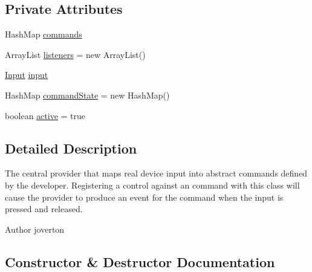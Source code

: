\subsection*{Private Attributes}
\begin{DoxyCompactItemize}
\item 
Hash\+Map \mbox{\hyperlink{classorg_1_1newdawn_1_1slick_1_1command_1_1_input_provider_ab2bd0c08506a59bc7457d7a87cf873d2}{commands}}
\item 
Array\+List \mbox{\hyperlink{classorg_1_1newdawn_1_1slick_1_1command_1_1_input_provider_a007146935ecc6c0f69ff3d7958042867}{listeners}} = new Array\+List()
\item 
\mbox{\hyperlink{classorg_1_1newdawn_1_1slick_1_1_input}{Input}} \mbox{\hyperlink{classorg_1_1newdawn_1_1slick_1_1command_1_1_input_provider_a7a9d7954c539d61bd8623da41c199d74}{input}}
\item 
Hash\+Map \mbox{\hyperlink{classorg_1_1newdawn_1_1slick_1_1command_1_1_input_provider_a343fea436b5ad6194968443cc58a632d}{command\+State}} = new Hash\+Map()
\item 
boolean \mbox{\hyperlink{classorg_1_1newdawn_1_1slick_1_1command_1_1_input_provider_ad390b811fb89db3fde054cc1ecae20b0}{active}} = true
\end{DoxyCompactItemize}


\subsection{Detailed Description}
The central provider that maps real device input into abstract commands defined by the developer. Registering a control against an command with this class will cause the provider to produce an event for the command when the input is pressed and released.

\begin{DoxyAuthor}{Author}
joverton 
\end{DoxyAuthor}


\subsection{Constructor \& Destructor Documentation}
\mbox{\label{classorg_1_1newdawn_1_1slick_1_1command_1_1_input_provider_a7a96bc94a4b7dcfc72bff1dbfbe243b7}} 
